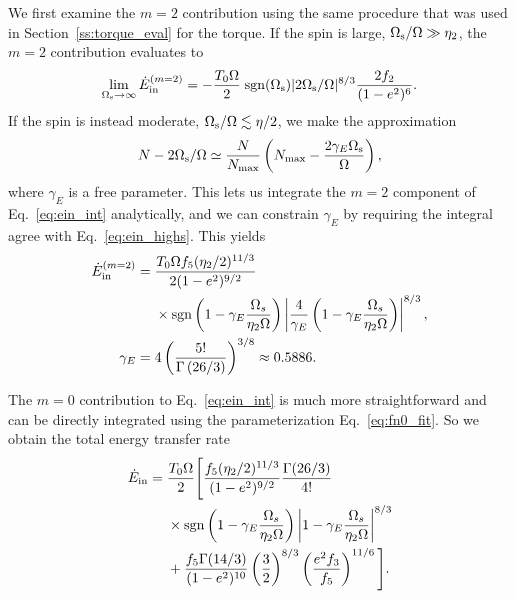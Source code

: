 \documentclass[
        fleqn,
        usenatbib,
    ]{mnras}
\newcommand*{\p}[1]{\left(#1\right)}
\begin{document}
We first examine the $m = 2$ contribution using the same procedure that was used
in Section~\ref{ss:torque_eval} for the torque. If the spin is large,
$\Omega_{\rm s} / \Omega \gg \eta_2$, the $m = 2$ contribution evaluates to
\begin{equation}
    \lim_{\Omega_{\rm s} \to \infty} \dot{E}_{\rm in}^{(m=2)} =
        -\frac{T_0\Omega}{2} \; \mathrm{sgn}(\Omega_{\rm s})|2\Omega_{\rm
        s}/\Omega|^{8/3} \frac{2f_2}{(1 - e^2)^6}.\label{eq:ein_highs}
\end{equation}
If the spin is instead moderate, $\Omega_{\rm s} / \Omega \lesssim \eta / 2$, we
make the approximation
\begin{equation}
    N - 2\Omega_{\rm s} / \Omega \simeq \frac{N}{N_{\max}}
        \left(N_{\max} - \frac{2\gamma_E
        \Omega_{\rm s}}{\Omega}\right)\label{eq:nmax_ansatz},
\end{equation}
where $\gamma_E$ is a free parameter. This lets us integrate the $m = 2$
component of Eq.~\eqref{eq:ein_int} analytically, and we can constrain
$\gamma_E$ by requiring the integral agree with Eq.~\eqref{eq:ein_highs}. This
yields
\begin{align}
    \dot{E}_{\rm in}^{(m=2)}
        ={}& \frac{T_0\Omega f_5 (\eta_2/2)^{11/3}}{2(1-e^2)^{9/2}}
            \nonumber\\
        &\times \mathrm{sgn}\p{1 - \gamma_E\frac{\Omega_s}{\eta_2 \Omega}}
            \left|
                \frac{4}{\gamma_E}
                \p{1 - \gamma_E\frac{\Omega_s}{\eta_2 \Omega}}
            \right|^{8/3},\\
    \gamma_E ={}& 4\p{\frac{5!}{\Gamma\p{26/3}}}^{3/8}
        \approx 0.5886.
\end{align}

The $m = 0$ contribution to Eq.~\eqref{eq:ein_int} is much more straightforward
and can be directly integrated using the parameterization
Eq.~\eqref{eq:fn0_fit}. So we obtain the total energy transfer rate
\begin{align}
    \dot{E}_{\rm in} ={}& \frac{T_0 \Omega}{2}\Bigg[\frac{f_5
        (\eta_2/2)^{11/3}}{(1-e^2)^{9/2}} \frac{\Gamma(26/3)}{4!}\nonumber\\
        &\times \mathrm{sgn}\p{1 - \gamma_E\frac{\Omega_s}{\eta_2 \Omega}}
            \left|1 - \gamma_E\frac{\Omega_s}{\eta_2 \Omega}\right|^{8/3}
            \nonumber\\
        &+
    \frac{f_5 \Gamma(14 / 3)}{(1 - e^2)^{10}} \left(\frac{3}{2}\right)^{8/3}
            \left(\frac{e^2 f_3}{f_5}\right)^{11/6}\Bigg].
            \label{eq:ein_dot_tot}
\end{align}
\end{document}
